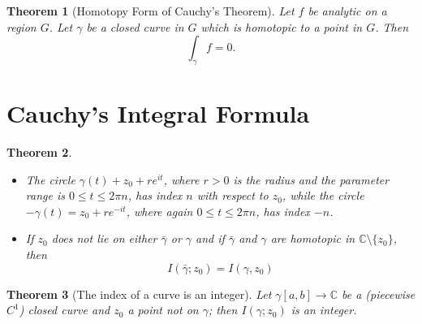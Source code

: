 \documentclass[a4paper]{article}
\newtheorem{theorem}{Theorem}
\newcommand{\C}{\mathbb{C}}
\begin{document}
\begin{theorem}[Homotopy Form of Cauchy's Theorem]
  Let \(f\) be analytic on a region \(G\). 
  Let \(\gamma\) be a closed curve in \(G\) which is homotopic to a point in \(G\). Then
  \[\int_\gamma f = 0.\]
  
\end{theorem}


\section{Cauchy's Integral Formula}
\begin{theorem}
  \begin{itemize}
    \item The circle \(\gamma(t) + z_0 + r e^{it}\), where \(r > 0\) is the radius and the parameter range is \(0 \leq t \leq 2 \pi n\), has index \(n\) with respect to \(z_0\), while the circle \(-\gamma(t) = z_0 + r e^{-it}\), where again \(0 \leq t \leq 2 \pi n\), has index \(-n\).
    \item If \(z_0\) does not lie on either \(\bar{\gamma}\) or \(\gamma\) and if \(\bar{\gamma}\) and \(\gamma\) are homotopic in \(\C \setminus \{z_0\}\), then
    \[ I(\bar{\gamma}; z_0) = I(\gamma, z_0)\]
  \end{itemize}
\end{theorem}

\begin{theorem}[The index of a curve is an integer]
  Let \(\gamma [a, b] \to \C\) be a (piecewise \(C^1\)) closed curve and \(z_0\) a point not on \(\gamma\); then \(I(\gamma; z_0)\) is an integer. 
\end{theorem}
\end{document}
